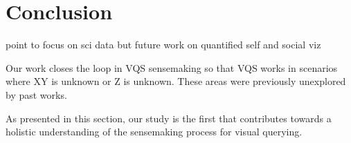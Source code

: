\section{Conclusion\label{sec:conclusion}}
point to focus on sci data but future work on quantified self and social viz


Our work closes the loop in VQS sensemaking so that VQS works in scenarios  where XY is unknown or Z is unknown. These areas were previously unexplored by past works.

As presented in this section, our study is the first that contributes towards a holistic understanding of the sensemaking process for visual querying.
